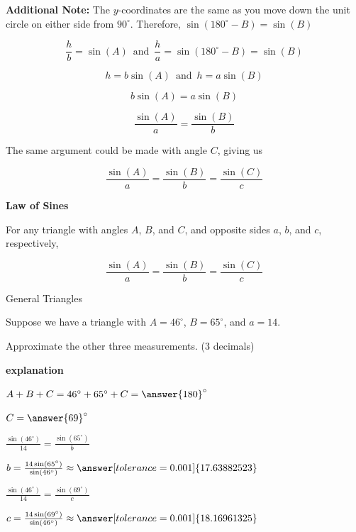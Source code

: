 \documentclass{ximera}
\begin{document}
\textbf{Additional Note:} The $y$-coordinates are the same as you move down the unit circle on either side from $90^{\circ}$.  Therefore, $\sin(180^{\circ} - B) = \sin(B)$ 




\[    \frac{h}{b} = \sin(A)   \, \text{ and } \,    \frac{h}{a} = \sin(180^{\circ} - B)  = \sin(B)      \]



\[    h = b \sin(A)      \, \text{ and } \,    h = a \sin(B)    \]

\[     b \sin(A)  = a \sin(B)    \]


\[    \frac{\sin(A)}{a} = \frac{\sin(B)}{b}      \]




The same argument could be made with angle $C$, giving us








\[    \frac{\sin(A)}{a} = \frac{\sin(B)}{b}  = \frac{\sin(C)}{c}    \]






\begin{theorem}  \textbf{\textcolor{-red!75!green}{Law of Sines}} 



For any triangle with angles $A$, $B$, and $C$, and opposite sides $a$, $b$, and $c$, respectively, 


\[    \frac{\sin(A)}{a} = \frac{\sin(B)}{b}  = \frac{\sin(C)}{c}    \]


\end{theorem}





\begin{example}  General Triangles 

Suppose we have a triangle with $A=46^{\circ}$, $B=65^{\circ}$, and $a=14$.

Approximate the other three measurements. (3 decimals)

\textbf{\textcolor{red!75!green}{explanation}} 

$A + B + C = 46^{\circ} + 65^{\circ} + C = \answer{180}^{\circ}$ 

$C = \answer{69}^{\circ}$


$\frac{\sin(46^{\circ})}{14} = \frac{\sin(65^{\circ})}{b}$

$b = \frac{14 \sin(65^{\circ})}{\sin(46^{\circ})} \approx \answer[tolerance=0.001]{17.63882523}$

$\frac{\sin(46^{\circ})}{14} = \frac{\sin(69^{\circ})}{c}$

$c = \frac{14 \sin(69^{\circ})}{\sin(46^{\circ})} \approx \answer[tolerance=0.001]{18.16961325}$




\end{example}
\end{document}
